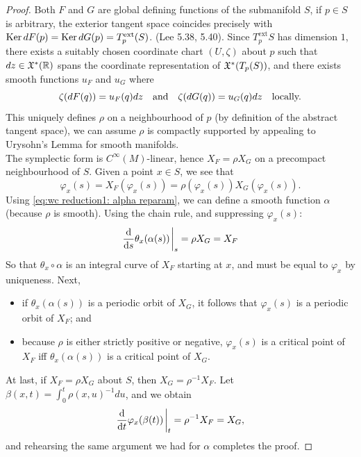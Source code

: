 \documentclass[../main-v2-manifolds.tex]{subfiles}
\begin{document}
\begin{proof}
    Both $F$ and $G$ are global defining functions of the submanifold $S$, if $p\in S$ is arbitrary, the exterior tangent space coincides precisely with $\operatorname{Ker} dF(p) = \operatorname{Ker} dG(p) = T^{\mathrm{ext}}_{p}(S)$. (Lee 5.38, 5.40). Since $T^{\mathrm{ext}}_{p}S$ has dimension $1$, there exists a suitably chosen coordinate chart $(U, \zeta)$ about $p$ such that $dz\in\mathfrak{X}^*(\mathbb{R})$ spans the coordinate representation of $\mathfrak{X}^*(T_p(S))$, and there exists smooth functions $u_F$ and $u_G$ where
    \[
        \zeta(dF(q)) = u_F(q)dz\qqtext{and}\zeta(dG(q)) = u_G(q)dz\quad\text{locally.}
    \]
    This uniquely defines $\rho$ on a neighbourhood of $p$ (by definition of the abstract tangent space), we can assume $\rho$ is compactly supported by appealing to Urysohn's Lemma for smooth manifolds.\\

    The symplectic form is $C^\infty(M)$-linear, hence $X_F = \rho X_G$ on a precompact neighbourhood of $S$. Given a point $x\in S$, we see that
    \[
        \varphi_x(s) = X_F(\varphi_x(s)) = \rho(\varphi_x(s)) X_G(\varphi_x(s)).
    \]
    Using \cref{eq:wc reduction1: alpha reparam}, we can define a smooth function $\alpha$ (because $\rho$ is smooth). Using the chain rule, and suppressing $\varphi_{x}(s)$:
    \[
        \dv{s} \theta_{x}(\alpha(s))\eval_s = \rho X_G = X_F
    \]
    So that $\theta_{x}\circ \alpha$ is an integral curve of $X_F$ starting at $x$, and must be equal to $\varphi_{x}$ by uniqueness. Next, 
    \begin{itemize}
        \item if $\theta_{x}(\alpha(s))$ is a periodic orbit of $X_G$, it follows that $\varphi_x(s)$ is a periodic orbit of $X_F$; and
        \item because $\rho$ is either strictly positive or negative, $\varphi_{x}(s)$ is a critical point of $X_F$ iff $\theta_{x}(\alpha(s))$ is a critical point of $X_G$.
    \end{itemize}
    At last, if $X_F = \rho X_G$ about $S$, then $X_G = \rho^{-1} X_F$. Let $\beta(x,t) = \int_0^t \rho(x,u)^{-1}du$, and we obtain
    \[
        \dv{t}\varphi_{x}(\beta(t))\eval_t = \rho^{-1}X_F = X_G,
    \]
    and rehearsing the same argument we had for $\alpha$ completes the proof.
\end{proof}
\end{document}
